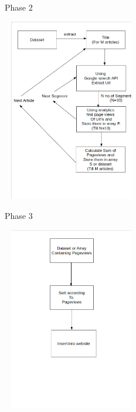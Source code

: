 \begin{frame}{Phase 2}
	\begin{center}
	\includegraphics[width=6cm, height=8cm]{proposedmethod/Phase2.png}
	\end{center}
\end{frame}
\begin{frame}{Phase 3}
	\begin{center}
	\includegraphics[width=6cm, height=8cm]{proposedmethod/Phase3.png}
	\end{center}
\end{frame}